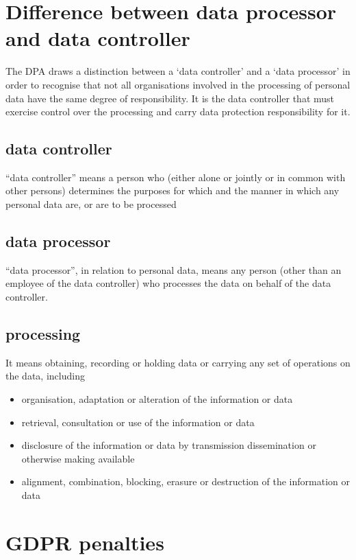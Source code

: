 \documentclass[a4paper,12pt]{article}
\begin{document}
\clearpage
 \section{Difference between data processor and data controller}
The DPA draws a distinction between a ‘data controller’ and a
‘data processor’ in order to recognise that not all organisations
involved in the processing of personal data have the same
degree of responsibility. It is the data controller that must
exercise control over the processing and carry data protection
responsibility for it. 

\subsection{data controller}
“data controller” means a person who (either alone or
jointly or in common with other persons) determines the
purposes for which and the manner in which any personal data
are, or are to be processed

\subsection{data processor}
“data processor”, in relation to personal data, means any
person (other than an employee of the data controller) who
processes the data on behalf of the data controller.

\subsection{processing}
It means
obtaining, recording or holding data or
carrying any set of operations on the
data, including
\begin{itemize}
    \item organisation, adaptation or alteration of the information or data
    \item retrieval, consultation or use of the information or data
    \item  disclosure of the information or data by transmission dissemination or otherwise making available
    \item  alignment, combination, blocking, erasure or destruction of the information or data
\end{itemize}

\section{GDPR penalties}
\end{document}
